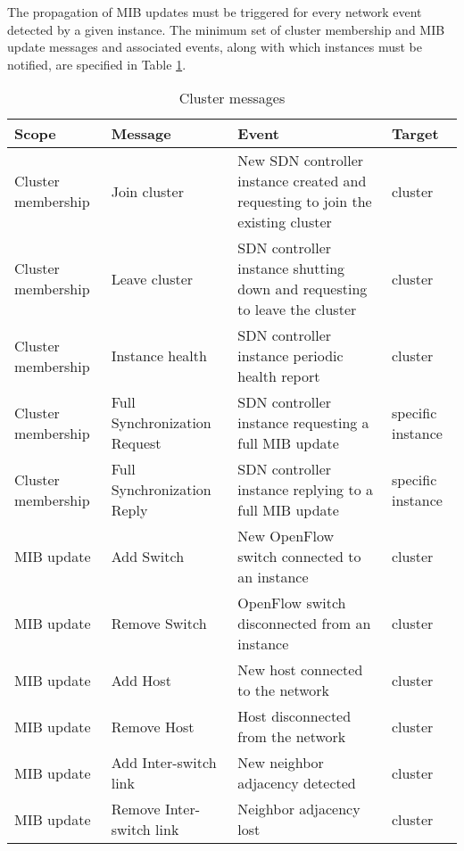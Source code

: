 The propagation of \gls{MIB} updates must be triggered for every network event detected by a given instance.
The minimum set of cluster membership and \gls{MIB} update messages and associated events, along with which instances must be notified, are specified in Table \ref{table:cluster-message-spec}.
%
\begin{table}[h!]
	\begin{center}
		\begin{tabular}{ | l | p{} | p{6cm} | p{} | }
			\rowcolor{HeaderRowColor}
			\hline
			\textbf{Scope} & \textbf{Message} & \textbf{Event} & \textbf{Target}\\
			\hline
			Cluster membership & Join cluster & New \gls{SDN} controller instance created and requesting to join the existing cluster & cluster\\
			\hline
			Cluster membership & Leave cluster & \gls{SDN} controller instance shutting down and requesting to leave the cluster & cluster\\
			\hline
			Cluster membership & Instance health & \gls{SDN} controller instance periodic health report & cluster\\
			\hline
			Cluster membership & Full Synchronization Request & \gls{SDN} controller instance requesting a full \gls{MIB} update & specific instance\\
			\hline
			Cluster membership & Full Synchronization Reply & \gls{SDN} controller instance replying to a full \gls{MIB} update & specific instance\\
			\hline
			\gls{MIB} update & Add Switch & New OpenFlow switch connected to an instance & cluster\\
			\hline
			\gls{MIB} update & Remove Switch & OpenFlow switch disconnected from an instance & cluster\\
			\hline
			\gls{MIB} update & Add Host & New host connected to the network & cluster\\
			\hline
			\gls{MIB} update & Remove Host & Host disconnected from the network & cluster\\
			\hline
			\gls{MIB} update & Add Inter-switch link & New neighbor adjacency detected & cluster\\
			\hline
			\gls{MIB} update & Remove Inter-switch link & Neighbor adjacency lost & cluster\\
			\hline
		\end{tabular}
		\caption{Cluster messages}
		\label{table:cluster-message-spec}
	\end{center}
\end{table}
